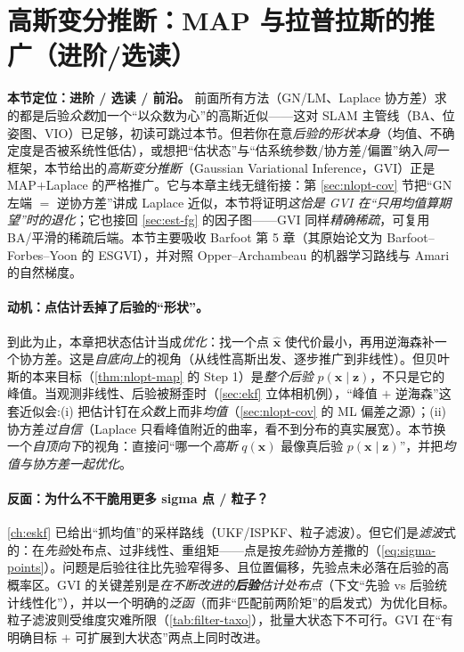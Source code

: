 \section{高斯变分推断：MAP 与拉普拉斯的推广（进阶/选读）}
\label{sec:nlopt-gvi}

\begin{note}
\textbf{本节定位：进阶 / 选读 / 前沿。} 前面所有方法（GN/LM、Laplace 协方差）求的都是后验\emph{众数}加一个“以众数为心”的高斯近似——这对 SLAM 主管线（BA、位姿图、VIO）已足够，初读可跳过本节。但若你在意\emph{后验的形状本身}（均值、不确定度是否被系统性低估），或想把“估状态”与“估系统参数/协方差/偏置”纳入\emph{同一}框架，本节给出的\emph{高斯变分推断}（Gaussian Variational Inference，GVI）正是 MAP$+$Laplace 的严格推广。它与本章主线无缝衔接：第 \ref{sec:nlopt-cov} 节把“GN 左端 $=$ 逆协方差”讲成 Laplace 近似，本节将证明\emph{这恰是 GVI 在“只用均值算期望”时的退化}；它也接回 \cref{sec:est-fg} 的因子图——GVI 同样\emph{精确稀疏}，可复用 BA/平滑的稀疏后端。本节主要吸收 Barfoot\cite{barfoot2024state} 第 5 章（其原始论文为 Barfoot--Forbes--Yoon 的 ESGVI\cite{barfoot2020esgvi}），并对照 Opper--Archambeau\cite{opper2009variational} 的机器学习路线与 Amari\cite{amari1998natural} 的自然梯度。
\end{note}

\paragraph{动机：点估计丢掉了后验的“形状”。}
到此为止，本章把状态估计当成\emph{优化}：找一个点 $\hat{\mathbf{x}}$ 使代价最小，再用逆海森补一个协方差。这是\emph{自底向上}的视角（从线性高斯出发、逐步推广到非线性）。但贝叶斯的本来目标（\cref{thm:nlopt-map} 的 Step 1）是\emph{整个后验} $p(\mathbf{x}\mid\mathbf{z})$，不只是它的峰值。当观测非线性、后验被掰歪时（\cref{sec:ekf} 立体相机例），“峰值 $+$ 逆海森”这套近似会:(i) 把估计钉在\emph{众数}上而非\emph{均值}（\cref{sec:nlopt-cov} 的 ML 偏差之源）；(ii) 协方差\emph{过自信}（Laplace 只看峰值附近的曲率，看不到分布的真实展宽）。本节换一个\emph{自顶向下}的视角：直接问“哪一个\emph{高斯} $q(\mathbf{x})$ 最像真后验 $p(\mathbf{x}\mid\mathbf{z})$”，并把\emph{均值与协方差一起优化}。

\paragraph{反面：为什么不干脆用更多 sigma 点 / 粒子？}
\cref{ch:eskf} 已给出“抓均值”的采样路线（UKF/ISPKF、粒子滤波）。但它们是\emph{滤波}式的：在\emph{先验}处布点、过非线性、重组矩——点是按\emph{先验}协方差撒的（\cref{eq:sigma-points}）。问题是后验往往比先验窄得多、且位置偏移，先验点未必落在后验的高概率区。GVI 的关键差别是\emph{在不断改进的\textbf{后验}估计处布点}（下文“先验 vs 后验统计线性化”），并以一个明确的\emph{泛函}（而非“匹配前两阶矩”的启发式）为优化目标。粒子滤波则受维度灾难所限（\cref{tab:filter-taxo}），批量大状态下不可行。GVI 在“有明确目标 $+$ 可扩展到大状态”两点上同时改进。

